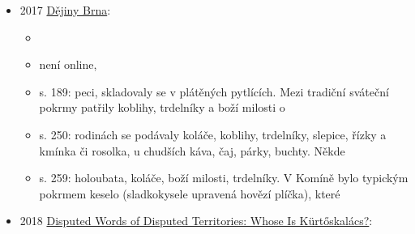 \begin{itemize}
  \begin{itemize}
  \tightlist
  \item
    \emph{Je libo trdelník se svíčkovou?}, 
  \item
    fejeton o tom, že známý z Francie na otázku, jestli měl nějakou
    typickou českou specialitu, odpověděl, že měl trdelník
  \item
    autorka neví, jak se mezi český rodinný stříbro probojoval trdelník,
    tak začala pátrat, nenašla ho ani v kuchařkách Rettigové a
    Sandtnerové, na Wikipedii se ale dočetla, že pochází ze
    Sedmihradska, odkud se s Maďary dostal do Skalice
  \item
    autorka trdelník zaznamenala dřív na trzích, ale nedávala mu šanci,
    přišel jí drahej. Kupodivu se ale úspěšně šíří nejen v Praze, ale i
    jinejch městech. Možná je to proto, že jeho příprava je show a to
    máme rádi.
  \item
    v poslední době se objevujou plněný zmrzlinou, nugátem, jahodama se
    šlehačkou, ale i slanými náplněma, třeba sýrem, šunkou, nebo s
    hotdogem. Autorka navrhuje, že by se mohl začít plnit i svíčkovou,
    její Francouz by pak dostal šanci ochutnat i pravou českou
    specialitu
  \end{itemize}
\item
  2017
  \href{https://www.digitalniknihovna.cz/mzk/uuid/uuid:f8646830-01e1-11e9-a5a4-005056827e52}{Dějiny
  Brna}:

  \begin{itemize}
  \tightlist
  \item
     
  \item
    není online, 
  \item
    s. 189: peci, skladovaly se v plátěných pytlících. Mezi tradiční
    sváteční pokrmy patřily koblihy, trdelníky a boží milosti o
  \item
    s. 250: rodinách se podávaly koláče, koblihy, trdelníky, slepice,
    řízky a kmínka či rosolka, u chudších káva, čaj, párky, buchty.
    Někde
  \item
    s. 259: holoubata, koláče, boží milosti, trdelníky. V Komíně bylo
    typickým pokrmem keselo (sladkokysele upravená hovězí plíčka), které
  \end{itemize}
\item
  2018 \href{https://www.ceeol.com/search/viewpdf?id=756237}{Disputed
  Words of Disputed Territories: Whose Is Kürtőskalács?}:


\end{itemize}
